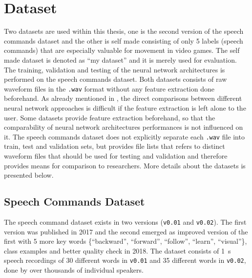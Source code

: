 
\section{Dataset}\label{sec:exp_dataset}
\thesisStateReady
Two datasets are used within this thesis, one is the second version of the speech commands dataset \cite{Warden2018} and the other is self made consisting of only 5 labels (speech commands) that are especially valuable for movement in video games.
The self made dataset is denoted as \enquote{my dataset} and it is merely used for evaluation.
The training, validation and testing of the neural network architectures is performed on the speech commands dataset.
Both datasets consists of raw waveform files in the \texttt{.wav} format without any feature extraction done beforehand.
As already mentioned in , the direct comparisons between different neural network approaches is difficult if the feature extraction is left alone to the user.
Some datasets provide feature extraction beforehand, so that the comparability of neural network architectures performances is not influenced on it.
The speech commands dataset does not explicitly separate each \texttt{.wav} file into train, test and validation sets, but provides file lists that refers to distinct waveform files that should be used for testing and validation and therefore provides means for comparison to researchers.
More details about the datasets is presented below.



% 



\subsection{Speech Commands Dataset}\label{sec:exp_dataset_speech_cmd}
The speech command dataset \cite{Warden2018} exists in two versions (\texttt{v0.01} and \texttt{v0.02}).
The first version was published in 2017 and the second emerged as improved version of the first with 5 more key words \{\enquote{backward}, \enquote{forward}, \enquote{follow}, \enquote{learn}, \enquote{visual}\}, class examples and better quality check in 2018.
The dataset consists of \SI{1}{\second} speech recordings of 30 different words in \texttt{v0.01} and 35 different words in \texttt{v0.02}, done by over thousands of individual speakers.

